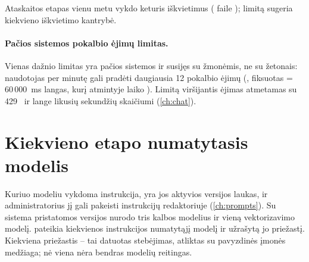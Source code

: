 Ataskaitos etapas vienu metu vykdo keturis iškvietimus ( faile
); limitą sugeria kiekvieno iškvietimo kantrybė.

\paragraph{Pačios sistemos pokalbio ėjimų limitas.} Vienas dažnio limitas yra pačios sistemos
ir susijęs su žmonėmis, ne su žetonais: naudotojas per minutę gali pradėti daugiausia 12
pokalbio ėjimų (, fiksuotas  = 60\,000~ms
langas, kurį atmintyje laiko ). Limitą viršijantis ėjimas
atmetamas su 429~ ir lange likusių sekundžių skaičiumi (\cref{ch:chat}).


\section{Kiekvieno etapo numatytasis modelis}\label{sec:models:defaults}

Kuriuo modeliu vykdoma instrukcija, yra jos aktyvios versijos laukas, ir administratorius jį
gali pakeisti instrukcijų redaktoriuje (\cref{ch:prompts}). Su sistema pristatomos versijos
nurodo tris kalbos modelius ir vieną vektorizavimo modelį.  pateikia
kiekvienos instrukcijos numatytąjį modelį ir užrašytą jo priežastį. Kiekviena priežastis -- tai
datuotas stebėjimas, atliktas su pavyzdinės įmonės medžiaga; nė viena nėra bendras modelių
reitingas.

